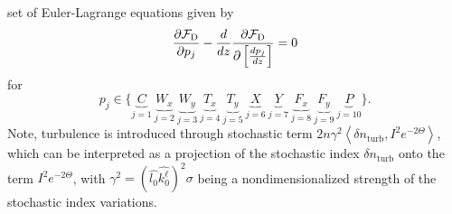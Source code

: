 \documentclass[9pt,twocolumn,twoside]{osajnl}
\newcommand\der[2]{\frac{d{#1}}{d{#2}}}
\newcommand\pder[2]{\frac{\partial #1}{\partial #2}}
\newcommand{\la}[1]{\label{#1}}
\begin{document}
set of Euler-Lagrange equations given by 
\begin{equation}\la{equ:ReducedEulerLagrange}
  \pder{{\cal F}_{\text{D}}}{p_{j}} - \der{}{z}\pder{{\cal F}_{\text{D}}}{\left[ \der{p_{j}}{z} \right]} = 0
\end{equation}
for 
\[
p_{j} \in \Bigg\{ \underbrace{C}_{j = 1} \ \underbrace{W_{x}}_{j = 2} \ \underbrace{W_{y}}_{j = 3} \ \underbrace{T_{x}}_{j = 4} \ \underbrace{T_{y}}_{j = 5} \ \underbrace{X}_{j = 6} \ \underbrace{Y}_{j = 7} \ \underbrace{F_{x}}_{j = 8} \ \underbrace{F_{y}}_{j = 9} \ \underbrace{P}_{j = 10} \Bigg\}.
\]
Note, turbulence is introduced through stochastic term 
$2n \gamma^2 \left< \delta n_{\text{turb}}, I^{2} e^{-2\Theta} \right>$,
which can be interpreted as a projection of the stochastic 
index $\delta n_{\text{turb}}$ onto the term $I^{2} e^{-2\Theta}$, 
with $\gamma^2 = \left(\widehat{l_{0}} \widehat{k_{0}^{\ell}}\right)^2 \sigma$
being a nondimensionalized strength of the stochastic index 
variations.  



\vspace*{-3mm}
\end{document}
